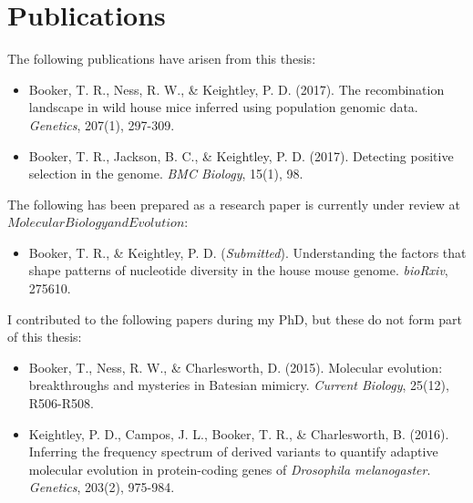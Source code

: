 \chapter{Publications}
\singlespacing
\noindent
The following publications have arisen from this thesis:
\begin{itemize}
\item Booker, T. R., Ness, R. W., \& Keightley, P. D. (2017). The recombination landscape in wild house mice inferred using population genomic data. \textit{Genetics}, 207(1), 297-309.
\item Booker, T. R., Jackson, B. C., \& Keightley, P. D. (2017). Detecting positive selection in the genome. \textit{BMC Biology}, 15(1), 98.
\end{itemize}
 
\noindent
The following has been prepared as a research paper is currently under review at $Molecular Biology and Evolution$:
\begin{itemize}
\item Booker, T. R., \& Keightley, P. D. (\textit{Submitted}). Understanding the factors that shape patterns of nucleotide diversity in the house mouse genome. \textit{bioRxiv}, 275610.
\end{itemize}
 
\noindent
I contributed to the following papers during my PhD, but these do not form part of this thesis:
\begin{itemize}
\item Booker, T., Ness, R. W., \& Charlesworth, D. (2015). Molecular evolution: breakthroughs and mysteries in Batesian mimicry. \textit{Current Biology}, 25(12), R506-R508.
\item Keightley, P. D., Campos, J. L., Booker, T. R., \& Charlesworth, B. (2016). Inferring the frequency spectrum of derived variants to quantify adaptive molecular evolution in protein-coding genes of \textit{Drosophila melanogaster}. \textit{Genetics}, 203(2), 975-984.
\end{itemize}
  \doublespacing